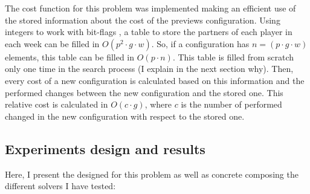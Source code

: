 

The cost function for this problem was implemented making an efficient use of the stored information about the cost of the previews configuration. Using integers to work with bit-flags , a table to store the partners of each player in each week can be filled in $O\left(p^2\cdot g \cdot w\right)$. So, if a configuration has $n = (p\cdot g \cdot w)$ elements, this table can be filled in $O\left(p\cdot n\right)$. This table is filled from scratch only one time in the search process (I explain in the next section why). Then, every cost of a new configuration is calculated based on this information and the performed changes between the new configuration and the stored one. This relative cost is calculated in $O\left(c\cdot g\right)$, where $c$ is the number of performed changed in the new configuration with respect to the stored one.

\subsection{Experiments design and results}

Here, I present the \as{} designed for this problem as well as concrete \oms{} composing the different solvers I have tested:

